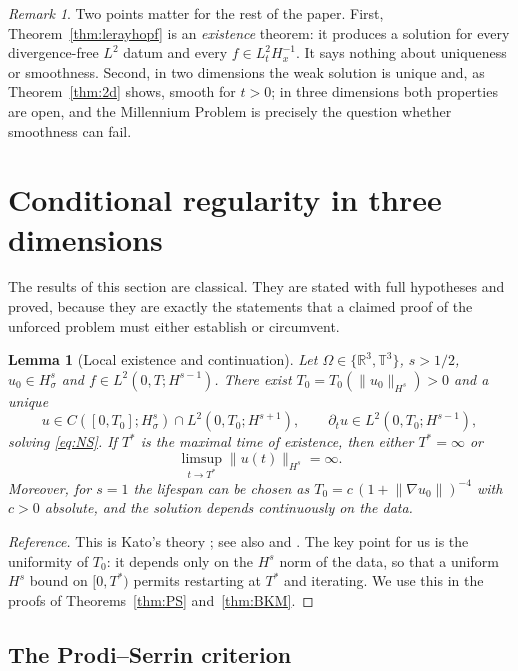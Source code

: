 \documentclass[11pt]{article}
\newtheorem{lemma}[theorem]{Lemma}
\theoremstyle{remark}
\newtheorem{remark}[theorem]{Remark}
\newcommand{\R}{\mathbb{R}}
\newcommand{\T}{\mathbb{T}}
\newcommand{\norm}[1]{\lVert #1\rVert}
\begin{document}
\begin{remark}\label{rem:weak}
Two points matter for the rest of the paper. First, Theorem~\ref{thm:lerayhopf} is an
\emph{existence} theorem: it produces a solution for every divergence-free $L^2$ datum and
every $f\in L^2_tH^{-1}_x$. It says nothing about uniqueness or smoothness. Second, in two
dimensions the weak solution is unique and, as Theorem~\ref{thm:2d} shows, smooth for $t>0$;
in three dimensions both properties are open, and the Millennium Problem is precisely the
question whether smoothness can fail.
\end{remark}

\section{Conditional regularity in three dimensions}\label{sec:3d}

The results of this section are classical. They are stated with full hypotheses and proved,
because they are exactly the statements that a claimed proof of the unforced problem must
either establish or circumvent.

\begin{lemma}[Local existence and continuation]\label{lem:local}
Let $\Omega\in\{\R^3,\T^3\}$, $s>1/2$, $u_0\in H^s_\sigma$ and
$f\in L^2(0,T;H^{s-1})$. There exist $T_0=T_0(\norm{u_0}_{H^s})>0$ and a unique
\[
u\in C([0,T_0];H^s_\sigma)\cap L^2(0,T_0;H^{s+1}),\qquad
\partial_tu\in L^2(0,T_0;H^{s-1}),
\]
solving \eqref{eq:NS}. If $T^*$ is the maximal time of existence, then either $T^*=\infty$ or
\begin{equation}\label{eq:blowupcrit}
\limsup_{t\to T^*}\norm{u(t)}_{H^s}=\infty .
\end{equation}
Moreover, for $s=1$ the lifespan can be chosen as
$T_0=c\,(1+\norm{\nabla u_0})^{-4}$ with $c>0$ absolute, and the solution depends
continuously on the data.
\end{lemma}

\begin{proof}[Reference]
This is Kato's theory \cite{Kato1984}; see also \cite[Chapter 3]{RRST2001} and
\cite[Chapter 5]{Lemarie2016}. The key point for us is the uniformity of $T_0$: it depends
only on the $H^s$ norm of the data, so that a uniform $H^s$ bound on $[0,T^*)$ permits
restarting at $T^*$ and iterating. We use this in the proofs of
Theorems~\ref{thm:PS} and~\ref{thm:BKM}.
\end{proof}

\subsection{The Prodi--Serrin criterion}
\end{document}
